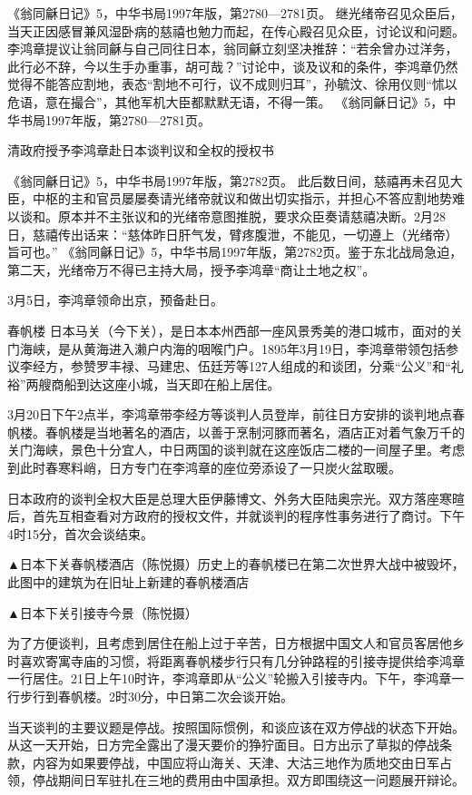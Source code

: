 \documentclass[12pt,UTF8]{ctexbook}
\begin{document}
《翁同龢日记》5，中华书局1997年版，第2780—2781页。
继光绪帝召见众臣后，当天正因感冒兼风湿卧病的慈禧也勉力而起，在传心殿召见众臣，讨论议和问题。李鸿章提议让翁同龢与自己同往日本，翁同龢立刻坚决推辞：“若余曾办过洋务，此行必不辞，今以生手办重事，胡可哉？”讨论中，谈及议和的条件，李鸿章仍然觉得不能答应割地，表态“割地不可行，议不成则归耳”，孙毓汶、徐用仪则“怵以危语，意在撮合”，其他军机大臣都默默无语，不得一策。 《翁同龢日记》5，中华书局1997年版，第2780—2781页。


清政府授予李鸿章赴日本谈判议和全权的授权书

《翁同龢日记》5，中华书局1997年版，第2782页。
此后数日间，慈禧再未召见大臣，中枢的主和官员屡屡奏请光绪帝就议和做出切实指示，并担心不答应割地势难以谈和。原本并不主张议和的光绪帝意图推脱，要求众臣奏请慈禧决断。2月28日，慈禧传出话来：“慈体昨日肝气发，臂疼腹泄，不能见，一切遵上（光绪帝）旨可也。” 《翁同龢日记》5，中华书局1997年版，第2782页。鉴于东北战局急迫，第二天，光绪帝万不得已主持大局，授予李鸿章“商让土地之权”。

3月5日，李鸿章领命出京，预备赴日。

春帆楼
日本马关（今下关），是日本本州西部一座风景秀美的港口城市，面对的关门海峡，是从黄海进入濑户内海的咽喉门户。1895年3月19日，李鸿章带领包括参议李经方，参赞罗丰禄、马建忠、伍廷芳等127人组成的和谈团，分乘“公义”和“礼裕”两艘商船到达这座小城，当天即在船上居住。

3月20日下午2点半，李鸿章带李经方等谈判人员登岸，前往日方安排的谈判地点春帆楼。春帆楼是当地著名的酒店，以善于烹制河豚而著名，酒店正对着气象万千的关门海峡，景色十分宜人，中日两国的谈判就在这座饭店二楼的一间屋子里。考虑到此时春寒料峭，日方专门在李鸿章的座位旁添设了一只炭火盆取暖。

日本政府的谈判全权大臣是总理大臣伊藤博文、外务大臣陆奥宗光。双方落座寒暄后，首先互相查看对方政府的授权文件，并就谈判的程序性事务进行了商讨。下午4时15分，首次会谈结束。


▲日本下关春帆楼酒店（陈悦摄）历史上的春帆楼已在第二次世界大战中被毁坏，此图中的建筑为在旧址上新建的春帆楼酒店


▲日本下关引接寺今景（陈悦摄）

为了方便谈判，且考虑到居住在船上过于辛苦，日方根据中国文人和官员客居他乡时喜欢寄寓寺庙的习惯，将距离春帆楼步行只有几分钟路程的引接寺提供给李鸿章一行居住。21日上午10时许，李鸿章即从“公义”轮搬入引接寺内。下午，李鸿章一行步行到春帆楼。2时30分，中日第二次会谈开始。

当天谈判的主要议题是停战。按照国际惯例，和谈应该在双方停战的状态下开始。从这一天开始，日方完全露出了漫天要价的狰狞面目。日方出示了草拟的停战条款，内容为如果要停战，中国应将山海关、天津、大沽三地作为质地交由日军占领，停战期间日军驻扎在三地的费用由中国承担。双方即围绕这一问题展开辩论。
\end{document}
